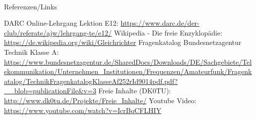 \renewcommand{\refname}{Referenzen}

\hypertarget{refs}{}
\textcolor{white}{} \\ %
\Large Referenzen/Links
\footnotesize

\begin{thebibliography}{}
    DARC Online-Lehrgang Lektion E12:
    \url{https://www.darc.de/der-club/referate/ajw/lehrgang-te/e12/}
      Wikipedia - Die freie Enzyklopädie:
    \url{https://de.wikipedia.org/wiki/Gleichrichter}
     Fragenkatalog Bundesnetzagentur Technik Klasse A:
    \url{https://www.bundesnetzagentur.de/SharedDocs/Downloads/DE/Sachgebiete/Telekommunikation/Unternehmen_Institutionen/Frequenzen/Amateurfunk/Fragenkatalog/TechnikFragenkatalogKlasseAf252rId9014pdf.pdf?__blob=publicationFile&v=3}
      Freie Inhalte (DK0TU):
    \url{http://www.dk0tu.de/Projekte/Freie_Inhalte/}
      Youtube Video:
    \url{https://www.youtube.com/watch?v=IcrBqCFLHIY}

\end{thebibliography}


